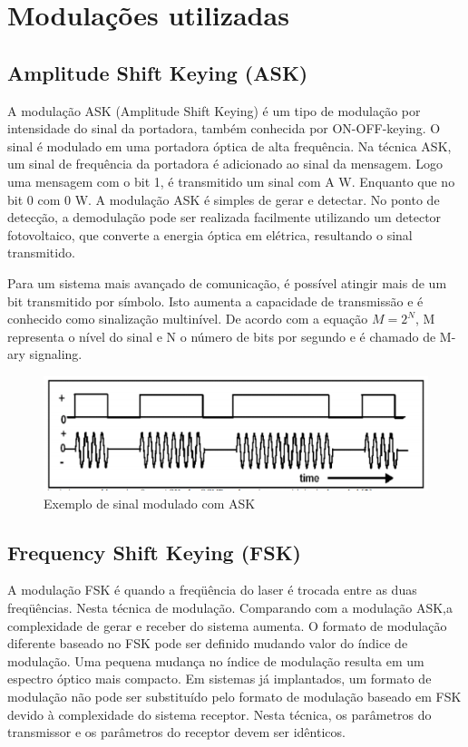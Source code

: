 \documentclass[article]{IEEEtran}
\begin{document}
\section{Modulações utilizadas}
\subsection{Amplitude Shift Keying (ASK)}
\par A modulação ASK (Amplitude Shift Keying) é um tipo de modulação por intensidade do sinal da portadora, também conhecida por ON-OFF-keying. O sinal é modulado em uma portadora óptica de alta frequência. Na técnica ASK, um sinal de frequência da portadora é adicionado ao sinal da mensagem. Logo uma mensagem com o bit 1, é transmitido um sinal com A W. Enquanto que no bit 0 com 0 W. A modulação ASK é simples de gerar e detectar. No ponto de detecção, a demodulação pode ser realizada facilmente utilizando um detector fotovoltaico, que converte a energia óptica em elétrica, resultando o sinal transmitido.
\par	Para um sistema mais avançado de comunicação, é possível atingir mais de um bit transmitido por símbolo. Isto aumenta a capacidade de transmissão e é conhecido como sinalização multinível. De acordo com a equação $M = 2^N$, M representa o nível do sinal e N o número de bits por segundo e é chamado de M-ary signaling.\cite{MODULATION}
\begin{figure}[hb]
\includegraphics[width=\columnwidth]{ask.png}
\caption{Exemplo de sinal modulado com ASK}
\end{figure}

\subsection{Frequency Shift Keying (FSK)}
\par A modulação FSK é quando a freqüência do laser é trocada entre as duas freqüências. Nesta técnica de modulação. Comparando com a modulação ASK,a complexidade de gerar e receber do sistema aumenta. O formato de modulação diferente baseado no FSK pode ser definido mudando valor do índice de modulação. Uma pequena mudança no índice de modulação resulta em um espectro óptico mais compacto. Em sistemas já implantados, um formato de modulação não pode ser substituído pelo formato de modulação baseado em FSK devido à complexidade do sistema receptor. Nesta técnica, os parâmetros do transmissor e os  parâmetros do receptor devem ser idênticos.\cite{MODULATION}
\end{document}
